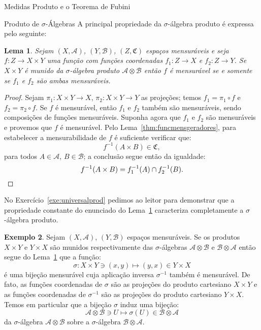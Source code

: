 \documentclass[oneside,final,11pt]{amsbook}
\theoremstyle{remark}\newtheorem{exercise}{Exercício}[chapter]
\theoremstyle{remark}\newtheorem{*exercise}[exercise]{\hbox to 0pt{\hskip 0pt minus 1fil*}Exercício}
\theoremstyle{definition}\newtheorem{exdefin}{Definição}[chapter]
\theoremstyle{plain}\newtheorem{teo}{Teorema}[section]
\theoremstyle{plain}\newtheorem{lem}[teo]{Lema}
\theoremstyle{plain}\newtheorem{prop}[teo]{Proposição}
\theoremstyle{plain}\newtheorem{cor}[teo]{Corolário}
\theoremstyle{definition}\newtheorem{defin}[teo]{Definição}
\theoremstyle{remark}\newtheorem{rem}[teo]{Observação}
\theoremstyle{definition}\newtheorem{notation}[teo]{Notação}
\theoremstyle{definition}\newtheorem{convention}[teo]{Convenção}
\theoremstyle{definition}\newtheorem{example}[teo]{Exemplo}
\numberwithin{section}{chapter}
\numberwithin{equation}{section}
\begin{document}
\begin{chapter}{Medidas Produto e o Teorema de Fubini}
\begin{section}{Produto de ${\sigma}$-Álgebras}
A principal propriedade da $\sigma$-álgebra produto é expressa pelo seguinte:
\begin{lem}\label{thm:menscoordmensgeral}
Sejam $(X,\mathcal A)$, $(Y,\mathcal B)$, $(Z,\mathfrak C)$ espaços mensuráveis e
seja $f:Z\to X\times Y$ uma função com funções coordenadas $f_1:Z\to X$ e $f_2:Z\to Y$.
Se $X\times Y$ é munido da $\sigma$-álgebra produto $\mathcal A\otimes\mathcal B$ então
$f$ é mensurável se e somente se $f_1$ e $f_2$ são ambas mensuráveis.
\end{lem}
\begin{proof}
Sejam $\pi_1:X\times Y\to X$, $\pi_2:X\times Y\to Y$ as projeções; temos $f_1=\pi_1\circ f$
e $f_2=\pi_2\circ f$. Se $f$ é mensurável, então $f_1$ e $f_2$ também são mensuráveis,
sendo composições de funções mensuráveis. Suponha agora que $f_1$ e $f_2$ são mensuráveis
e provemos que $f$ é mensurável. Pelo Lema~\ref{thm:funcmensgeradores}, para estabelecer
a mensurabilidade de $f$ é suficiente verificar que:
\[f^{-1}(A\times B)\in\mathfrak C,\]
para todos $A\in\mathcal A$, $B\in\mathcal B$; a conclusão segue então da igualdade:
\[f^{-1}(A\times B)=f_1^{-1}(A)\cap f_2^{-1}(B).\qedhere\]
\end{proof}
No Exercício~\ref{exe:universalprod} pedimos ao leitor para demonstrar que a propriedade
constante do enunciado do Lema~\ref{thm:menscoordmensgeral} caracteriza completamente a $\sigma$-álgebra produto.

\begin{example}\label{thm:funcaotroca}
Sejam $(X,\mathcal A)$, $(Y,\mathcal B)$ espaços mensuráveis. Se os produtos $X\times Y$ e $Y\times X$ são
munidos respectivamente das $\sigma$-álgebras $\mathcal A\otimes\mathcal B$ e $\mathcal B\otimes\mathcal A$ então
segue do Lema~\ref{thm:menscoordmensgeral} que a função:
\[\sigma:X\times Y\ni(x,y)\longmapsto(y,x)\in Y\times X\]
é uma bijeção mensurável cuja aplicação inversa $\sigma^{-1}$ também é mensurável. De fato, as funções coordenadas
de $\sigma$ são as projeções do produto cartesiano $X\times Y$ e as funções coordenadas de $\sigma^{-1}$ são
as projeções do produto cartesiano $Y\times X$. Temos em particular que a bijeção $\sigma$ induz uma bijeção:
\[\mathcal A\otimes\mathcal B\ni U\longmapsto\sigma(U)\in\mathcal B\otimes\mathcal A\]
da $\sigma$-álgebra $\mathcal A\otimes\mathcal B$ sobre a $\sigma$-álgebra $\mathcal B\otimes\mathcal A$.
\end{example}


\end{section}
\end{chapter}
\end{document}
